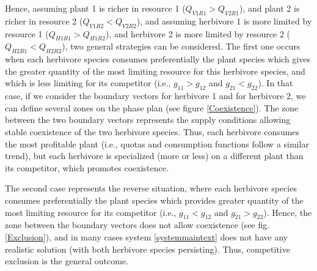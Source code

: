 \documentclass[12pt]{article}
\begin{document}
Hence, assuming plant 1 is richer in resource 1 ($Q_{V1R1}>Q_{V2R1}$), and plant 2 is richer in resource 2 ($Q_{V1R2}<Q_{V2R2}$), and assuming herbivore 1 is more limited by resource 1 ($Q_{H1R1}>Q_{H1R2}$), and herbivore 2 is more limited by resource 2 ($Q_{H2R1}<Q_{H2R2}$), two general strategies can be considered. The first one occurs when each herbivore species consumes preferentially the plant species which gives the greater quantity of the most limiting resource for this herbivore species, and which is less limiting for its competitor (i.e., $g_{11}>g_{12}$ and $g_{21}<g_{22}$). In that case, if we consider the boundary vectors for herbivore 1 and for herbivore 2, we can define several zones on the phase plan (see figure \ref{Coexistence}). The zone between the two boundary vectors represents the supply conditions allowing stable coexistence of the two herbivore species. Thus, each herbivore consumes the most profitable plant (i.e., quotas and consumption functions follow a similar trend), but each herbivore is specialized (more or less) on a different plant than its competitor, which promotes coexistence. 
\par
The second case represents the reverse situation, where each herbivore species consumes preferentially the plant species which provides greater quantity of the most limiting resource for its competitor (i.e., $g_{11}<g_{12}$ and $g_{21}>g_{22}$). Hence, the zone between the boundary vectors does not allow coexistence (see fig.  \ref{Exclusion}), and in many cases system \ref{systemmaintext} does not have any realistic solution (with both herbivore species persisting). Thus, competitive exclusion is the general outcome. 
\par 
\end{document}
